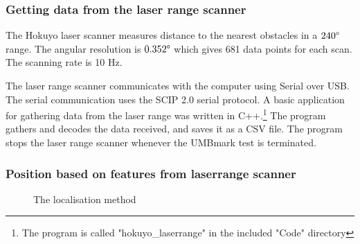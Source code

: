 \subsubsection{Getting data from the laser range scanner}
The Hokuyo laser scanner measures distance to the nearest obstacles in a $240 \degree$ range. The angular resolution is $0.352 \degree$ which gives 681 data points for each scan. The scanning rate is 10 Hz.

The laser range scanner communicates with the computer using Serial over USB. The serial communication uses the SCIP 2.0 serial protocol. 
A basic application for gathering data from the laser range was written in C++.\footnote{The program is called "hokuyo\_laserrange" in the included "Code" directory} 
The program gathers and decodes the data received, and saves it as a CSV file. The program stops the laser range scanner whenever the UMBmark test is terminated.



\subsubsection{Position based on features from laserrange scanner}

\begin{figure}
  
  \caption{The localisation method}
  \label{fig:localisation}
\end{figure}

